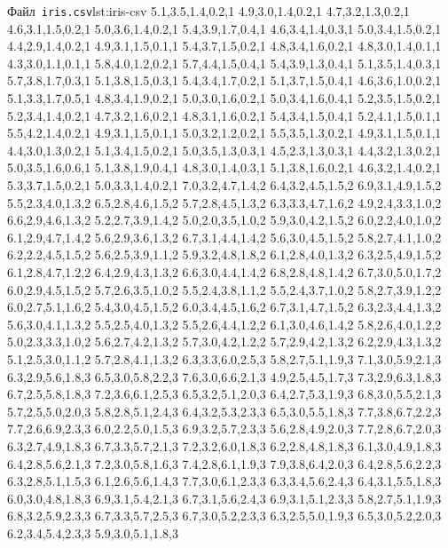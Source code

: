 \documentclass[
	a4paper,
	oneside,
	DIV = 12,
	fontsize = 13pt,
	headings = normal,
	numbers = endperiod,
	bibliography = totoc, %
]{scrartcl}
\theoremstyle{mythm}
\newcommand{\filename}[1]{\texttt{#1}}
\begin{document}
	\newpage
		\begin{listingpython}[toprule = 0pt, bottomrule = 0pt]{Файл~\filename{iris.csv}}{lst:iris-csv}
5.1,3.5,1.4,0.2,1
4.9,3.0,1.4,0.2,1
4.7,3.2,1.3,0.2,1
4.6,3.1,1.5,0.2,1
5.0,3.6,1.4,0.2,1
5.4,3.9,1.7,0.4,1
4.6,3.4,1.4,0.3,1
5.0,3.4,1.5,0.2,1
4.4,2.9,1.4,0.2,1
4.9,3.1,1.5,0.1,1
5.4,3.7,1.5,0.2,1
4.8,3.4,1.6,0.2,1
4.8,3.0,1.4,0.1,1
4.3,3.0,1.1,0.1,1
5.8,4.0,1.2,0.2,1
5.7,4.4,1.5,0.4,1
5.4,3.9,1.3,0.4,1
5.1,3.5,1.4,0.3,1
5.7,3.8,1.7,0.3,1
5.1,3.8,1.5,0.3,1
5.4,3.4,1.7,0.2,1
5.1,3.7,1.5,0.4,1
4.6,3.6,1.0,0.2,1
5.1,3.3,1.7,0.5,1
4.8,3.4,1.9,0.2,1
5.0,3.0,1.6,0.2,1
5.0,3.4,1.6,0.4,1
5.2,3.5,1.5,0.2,1
5.2,3.4,1.4,0.2,1
4.7,3.2,1.6,0.2,1
4.8,3.1,1.6,0.2,1
5.4,3.4,1.5,0.4,1
5.2,4.1,1.5,0.1,1
5.5,4.2,1.4,0.2,1
4.9,3.1,1.5,0.1,1
5.0,3.2,1.2,0.2,1
5.5,3.5,1.3,0.2,1
4.9,3.1,1.5,0.1,1
4.4,3.0,1.3,0.2,1
5.1,3.4,1.5,0.2,1
5.0,3.5,1.3,0.3,1
4.5,2.3,1.3,0.3,1
4.4,3.2,1.3,0.2,1
5.0,3.5,1.6,0.6,1
5.1,3.8,1.9,0.4,1
4.8,3.0,1.4,0.3,1
5.1,3.8,1.6,0.2,1
4.6,3.2,1.4,0.2,1
5.3,3.7,1.5,0.2,1
5.0,3.3,1.4,0.2,1
7.0,3.2,4.7,1.4,2
6.4,3.2,4.5,1.5,2
6.9,3.1,4.9,1.5,2
5.5,2.3,4.0,1.3,2
6.5,2.8,4.6,1.5,2
5.7,2.8,4.5,1.3,2
6.3,3.3,4.7,1.6,2
4.9,2.4,3.3,1.0,2
6.6,2.9,4.6,1.3,2
5.2,2.7,3.9,1.4,2
5.0,2.0,3.5,1.0,2
5.9,3.0,4.2,1.5,2
6.0,2.2,4.0,1.0,2
6.1,2.9,4.7,1.4,2
5.6,2.9,3.6,1.3,2
6.7,3.1,4.4,1.4,2
5.6,3.0,4.5,1.5,2
5.8,2.7,4.1,1.0,2
6.2,2.2,4.5,1.5,2
5.6,2.5,3.9,1.1,2
5.9,3.2,4.8,1.8,2
6.1,2.8,4.0,1.3,2
6.3,2.5,4.9,1.5,2
6.1,2.8,4.7,1.2,2
6.4,2.9,4.3,1.3,2
6.6,3.0,4.4,1.4,2
6.8,2.8,4.8,1.4,2
6.7,3.0,5.0,1.7,2
6.0,2.9,4.5,1.5,2
5.7,2.6,3.5,1.0,2
5.5,2.4,3.8,1.1,2
5.5,2.4,3.7,1.0,2
5.8,2.7,3.9,1.2,2
6.0,2.7,5.1,1.6,2
5.4,3.0,4.5,1.5,2
6.0,3.4,4.5,1.6,2
6.7,3.1,4.7,1.5,2
6.3,2.3,4.4,1.3,2
5.6,3.0,4.1,1.3,2
5.5,2.5,4.0,1.3,2
5.5,2.6,4.4,1.2,2
6.1,3.0,4.6,1.4,2
5.8,2.6,4.0,1.2,2
5.0,2.3,3.3,1.0,2
5.6,2.7,4.2,1.3,2
5.7,3.0,4.2,1.2,2
5.7,2.9,4.2,1.3,2
6.2,2.9,4.3,1.3,2
5.1,2.5,3.0,1.1,2
5.7,2.8,4.1,1.3,2
6.3,3.3,6.0,2.5,3
5.8,2.7,5.1,1.9,3
7.1,3.0,5.9,2.1,3
6.3,2.9,5.6,1.8,3
6.5,3.0,5.8,2.2,3
7.6,3.0,6.6,2.1,3
4.9,2.5,4.5,1.7,3
7.3,2.9,6.3,1.8,3
6.7,2.5,5.8,1.8,3
7.2,3.6,6.1,2.5,3
6.5,3.2,5.1,2.0,3
6.4,2.7,5.3,1.9,3
6.8,3.0,5.5,2.1,3
5.7,2.5,5.0,2.0,3
5.8,2.8,5.1,2.4,3
6.4,3.2,5.3,2.3,3
6.5,3.0,5.5,1.8,3
7.7,3.8,6.7,2.2,3
7.7,2.6,6.9,2.3,3
6.0,2.2,5.0,1.5,3
6.9,3.2,5.7,2.3,3
5.6,2.8,4.9,2.0,3
7.7,2.8,6.7,2.0,3
6.3,2.7,4.9,1.8,3
6.7,3.3,5.7,2.1,3
7.2,3.2,6.0,1.8,3
6.2,2.8,4.8,1.8,3
6.1,3.0,4.9,1.8,3
6.4,2.8,5.6,2.1,3
7.2,3.0,5.8,1.6,3
7.4,2.8,6.1,1.9,3
7.9,3.8,6.4,2.0,3
6.4,2.8,5.6,2.2,3
6.3,2.8,5.1,1.5,3
6.1,2.6,5.6,1.4,3
7.7,3.0,6.1,2.3,3
6.3,3.4,5.6,2.4,3
6.4,3.1,5.5,1.8,3
6.0,3.0,4.8,1.8,3
6.9,3.1,5.4,2.1,3
6.7,3.1,5.6,2.4,3
6.9,3.1,5.1,2.3,3
5.8,2.7,5.1,1.9,3
6.8,3.2,5.9,2.3,3
6.7,3.3,5.7,2.5,3
6.7,3.0,5.2,2.3,3
6.3,2.5,5.0,1.9,3
6.5,3.0,5.2,2.0,3
6.2,3.4,5.4,2.3,3
5.9,3.0,5.1,1.8,3
		\end{listingpython}
\end{document}
